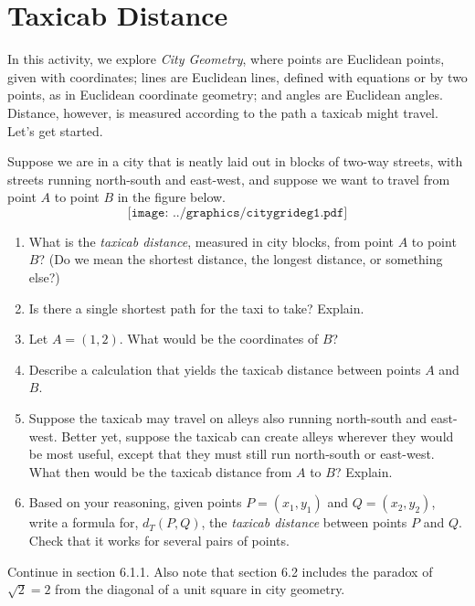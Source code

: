 \newpage

\section{Taxicab Distance}
In this activity, we explore \emph{City Geometry}, where points are Euclidean points, given with coordinates; lines are Euclidean lines, defined with equations or by two points, as in Euclidean coordinate geometry; and angles are Euclidean angles.  Distance, however, is measured according to the path a taxicab might travel.  Let's get started.  
\begin{prob}
Suppose we are in a city that is neatly laid out in blocks of two-way streets, with streets running north-south and east-west, and suppose we want to travel from point $A$ to point $B$ in the figure below.  
\[
\texttt{[image: ../graphics/citygrideg1.pdf]}
\]
\begin{enumerate}
\item What is the \emph{taxicab distance}, measured in city blocks, from point $A$ to point $B$?  (Do we mean the shortest distance, the longest distance, or something else?)  
\item Is there a single shortest path for the taxi to take?  Explain.  
\item Let $A = (1,2)$. What would be the coordinates of $B$?  
\item Describe a calculation that yields the taxicab distance between points $A$ and $B$.  
\item Suppose the taxicab may travel on alleys also running north-south and east-west.  Better yet, suppose the taxicab can create alleys wherever they would be most useful, except that they must still run north-south or east-west.  What then would be the taxicab distance from $A$ to $B$?  Explain.  
\item Based on your reasoning, given points $P = (x_1, y_1)$ and $Q= (x_2, y_2)$, write a formula for, $d_T(P,Q)$, the \emph{taxicab distance} between points $P$ and $Q$.  Check that it works for several pairs of points.  
\end{enumerate}
\end{prob}

\begin{teachingnote}
Continue in section 6.1.1. Also note that section 6.2 includes the paradox of $\sqrt{2}=2$ from the diagonal of a unit square in city geometry.
\end{teachingnote}
  


